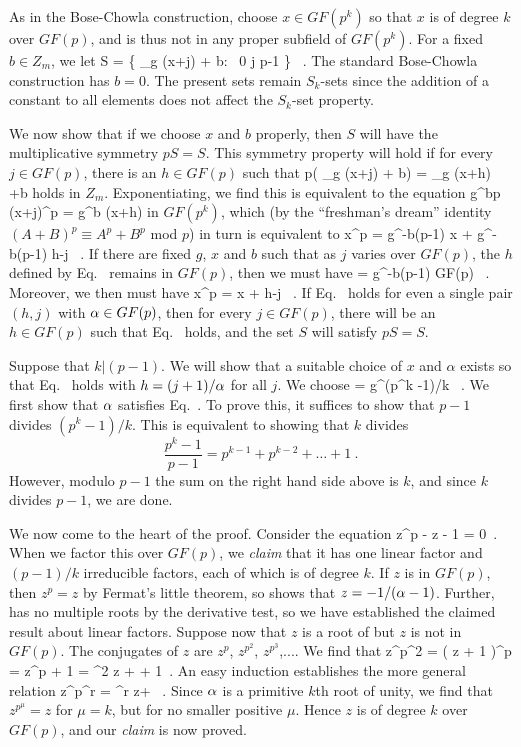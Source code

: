 As in the Bose-Chowla construction, choose $x \in GF(p^k)$ so that $x$ is of
degree $k$ over $GF(p)$, and is thus not in any proper
subfield of $GF(p^k)$.
For a fixed $b \in Z_m$, we let
S = \{ \log_g (x+j) + b:~ 0 \le j \le p-1 \} ~.
\eeq
The standard Bose-Chowla construction has $b=0$. The present sets
remain $S_k$-sets since the addition of a constant to all elements does
not affect the $S_k$-set property.

We now show that if we choose $x$ and $b$ properly, then $S$ will have
the multiplicative symmetry $pS=S$.
This symmetry property will hold if for every
$j \in GF(p)$, there is an $h \in GF(p)$ such that
p( \log_g (x+j) + b) = \log_g (x+h) +b
\eeq
holds in $Z_m$.
Exponentiating, we find this is equivalent to the equation
g^{bp} (x+j)^p = g^b (x+h)
\eeq
in $GF(p^k)$, which (by the ``freshman's dream'' identity $(A+B)^p \equiv
A^p + B^p$ mod $p$) in turn is equivalent to
x^p = g^{-b(p-1)} x + g^{-b(p-1)} h-j ~.
\eeq
If there are fixed $g$, $x$ and $b$ such that as $j$ varies over
$GF(p)$, the $h$ defined by Eq.~
remains in $GF(p)$,
then we must have
\af = g^{-b(p-1)} \in GF(p) ~.
\eeq
Moreover, we then must have
x^p = \af x + \af h-j ~.
\eeq
If Eq.~ holds for even a single pair $(h,j)$ with $\alpha \in GF(p)$,
then for every $j \in GF(p)$,
there will be an $h \in GF(p)$ such that
Eq.~ holds, and the set $S$ will satisfy $pS=S$.

Suppose that $k | (p-1)$. We will show that
a suitable choice
of $x$ and $\alpha$
exists so that Eq.~ holds with $h = (j+1) / \alpha$ for all
$j$. We choose
\af = g^{(p^k -1)/k} ~.
\eeq
We first show that $\alpha$ satisfies Eq.~.
To prove this, it suffices to show that $p-1$ divides $(p^k-1)/k$.
This is equivalent to showing that $k$ divides 
$$
       \frac{p^k-1}{p-1} = p^{k-1} + p^{k-2} + \dots + 1 ~.
$$
However, modulo $p-1$ the sum on the right hand side above is $k$,
and since $k$ divides $p-1$, we are done.

We now come to the heart of the proof.
Consider the equation
	z^p - \af z - 1 = 0~.
\eeq
When we factor this over $GF(p)$, we {\it claim} that it has one linear
factor and $(p-1)/k$ irreducible factors, each of which is of degree $k$.
If $z$ is in $GF(p)$, then $z^p = z$ by Fermat's little theorem,
so  shows that $z = -1/(\alpha-1)$.
Further,  has no multiple roots by the derivative test, so
we have established the claimed result about linear factors.
Suppose now that $z$ is a root of  but $z$ is not in $GF(p)$.
The conjugates of $z$ are $z^p$, $z^{p^2}$, $z^{p^3}$,....  We find that 
z^{p^2} = ( \af  z + 1 )^p = \af  z^p + 1
	        = \af^2  z + \af + 1~.
\eeq
An easy induction establishes the more general relation
     z^{p^r} = \af^r z+  ~.
\eeq
Since $\alpha$ is a primitive $k$th root of unity, we find that
$z^{p^\mu} = z$ for $\mu = k$, but for no smaller positive $\mu$.  Hence
$z$ is of degree $k$ over $GF(p)$, and our {\em claim} is
now proved.

